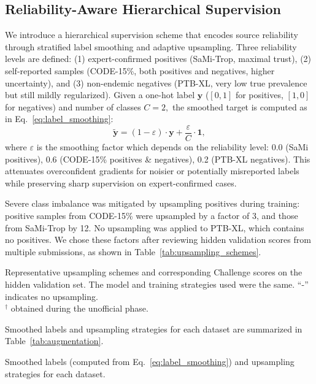 \subsection{Reliability-Aware Hierarchical Supervision}
\label{subsec:reliability}


We introduce a hierarchical supervision scheme that encodes source reliability through stratified label smoothing and adaptive upsampling. Three reliability levels are defined: (1) expert-confirmed positives (SaMi-Trop, maximal trust), (2) self-reported samples (CODE-15\%, both positives and negatives, higher uncertainty), and (3) non-endemic negatives (PTB-XL, very low true prevalence but still mildly regularized). Given a one-hot label $\mathbf{y}$ ($[0, 1]$ for positives, $[1, 0]$ for negatives) and number of classes $C = 2,$ the smoothed target is computed as in Eq.~\ref{eq:label_smoothing}:
\begin{equation}
\label{eq:label_smoothing}
\tilde{\mathbf{y}} = (1 - \varepsilon) \cdot {\mathbf{y}} + \frac{\varepsilon}{C} \cdot {\mathbf{1}},
\end{equation}
where $\varepsilon$ is the smoothing factor which depends on the reliability level: 0.0 (SaMi positives), 0.6 (CODE-15\% positives \& negatives), 0.2 (PTB-XL negatives). This attenuates overconfident gradients for noisier or potentially misreported labels while preserving sharp supervision on expert-confirmed cases.

Severe class imbalance was mitigated by upsampling positives during training: positive samples from CODE-15\% were upsampled by a factor of 3, and those from SaMi-Trop by 12. No upsampling was applied to PTB-XL, which contains no positives. We chose these factors after reviewing hidden validation scores from multiple submissions, as shown in Table~\ref{tab:upsampling_schemes}.
\begin{table}[!htbp]
\centering

\caption{Representative upsampling schemes and corresponding Challenge scores on the hidden validation set. The model and training strategies used were the same. “-” indicates no upsampling.\\
$^\dagger$ obtained during the unofficial phase.
}
\label{tab:upsampling_schemes}
\end{table}


Smoothed labels and upsampling strategies for each dataset are summarized in Table~\ref{tab:augmentation}.


\begin{table}[!htp]
\centering

\caption{Smoothed labels (computed from Eq.~\ref{eq:label_smoothing}) and upsampling strategies for each dataset.}
\label{tab:augmentation}
\end{table}


